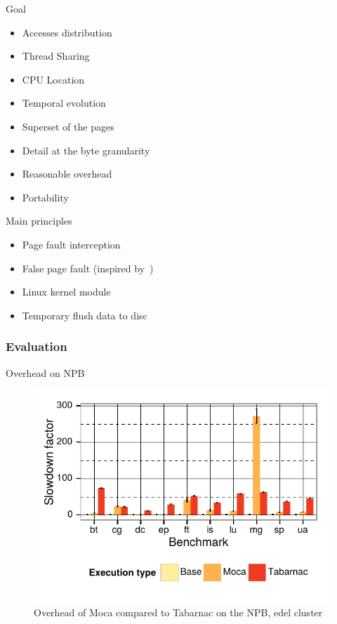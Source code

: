 \documentclass[xcolor={usenames,dvipsnames}]{beamer}
\makeatletter
\newcommand{\alertitem}{\item<+-|alert@+->}
\makeatother
\begin{document}
\begin{frame}{Goal}
    \begin{itemize}[<+->]
        \item Accesses distribution
        \item Thread Sharing
        \item CPU Location
        \alertitem Temporal evolution
        \alertitem Superset of the pages
        \item Detail at the byte granularity
        \item Reasonable overhead
        \alertitem Portability
    \end{itemize}
\end{frame}

\begin{frame}{Main principles}
    \begin{itemize}[<+->]
        \alertitem Page fault interception
        \item False page fault (inspired by~\cite{Diener12Using})
        \item Linux kernel module
        \item Temporary flush data to disc
    \end{itemize}
\end{frame}

\subsubsection*{Evaluation}

\begin{frame}{Overhead on NPB}
    \begin{figure}[]
        \centering
        \includegraphics[width=.7\linewidth]{moca_overhead_nas.pdf}
        \caption{Overhead of Moca compared to Tabarnac on the NPB, edel
        cluster}
    \end{figure}
\end{frame}
\end{document}
